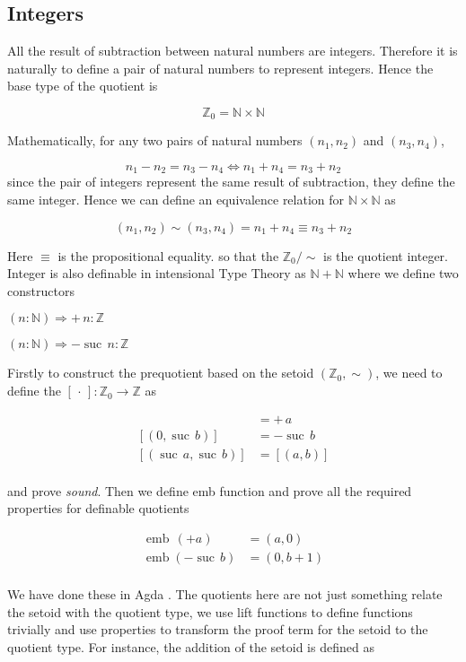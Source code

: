 \documentclass[envcountsame]{llncs}
\newcommand{\N}{\mathbb{N}}
\newcommand{\Z}{\mathbb{Z}}
\newcommand{\dotph}{\,\cdot\,}
\providecommand{\class}[1]{[#1]}
\DeclareMathOperator{\emb}{emb}
\DeclareMathOperator{\suc}{suc\,}
\begin{document}
\subsection{Integers}


All the result of subtraction between natural numbers are integers. Therefore it is naturally to define a pair of
natural numbers to represent integers. Hence the base type of the quotient is

$$\Z_0=\N \times \N$$

Mathematically, for any two pairs of natural numbers $(n_1, n_2)$ and $(n_3, n_4)$, 

$$ n_1 - n_2 = n_3 - n_4\iff n_1 + n_4 = n_3 + n_2$$
since the pair of integers represent the same result of subtraction, they define the same integer. Hence we can define an equivalence relation for $\N \times \N$ as

\[ (n_1, n_2) \sim (n_3, n_4) = n_1 + n_4 \equiv n_3 + n_2 
 \]


Here $\equiv$ is the propositional equality. so that the $\Z_0/\sim$ is the quotient integer.
Integer is also definable in intensional Type Theory as $\N+\N$ where we define two constructors

$ (n \colon \N) \Rightarrow + \,n \colon\Z$

$ (n \colon \N) \Rightarrow -\suc n \colon\Z$


Firstly to construct the prequotient based on the setoid $(\Z_0,\sim)$, we need to define the $\class\dotph \colon \Z_0 \to \Z$ as

\begin{align*}
\class{(a,0)} &= +\,a\\
\class{(0,\suc b)} &= -\suc b\\
\class{(\suc a,\suc b)} &= \class{(a,b)}\\
\end{align*}

and prove \emph{sound}. Then we define emb function and prove all the required properties for definable quotients


\begin{align*}
\emb \,(+ a) &= (a,0)\\
\emb (-\suc b) &= (0,b+1)\\
\end{align*}

We have done these in Agda \cite{nuo:10}. The quotients here are not just something relate the setoid with the quotient type, we use lift functions to define functions trivially and use properties to transform the proof term for the setoid to the quotient type. For instance, the addition of the setoid is defined as
\end{document}
